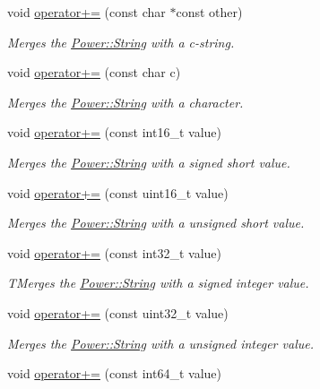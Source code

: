 \begin{DoxyCompactItemize}
void \hyperlink{class_power_1_1_string_a49e4abf34ef85a8d709aa0b6e37a283e}{operator+=} (const char $\ast$const other)
\begin{DoxyCompactList}\small\item\em Merges the \hyperlink{class_power_1_1_string}{Power\+::\+String} with a c-\/string. \end{DoxyCompactList}\item 
void \hyperlink{class_power_1_1_string_a52dac2961382313c2817ae2186d09a9e}{operator+=} (const char c)
\begin{DoxyCompactList}\small\item\em Merges the \hyperlink{class_power_1_1_string}{Power\+::\+String} with a character. \end{DoxyCompactList}\item 
void \hyperlink{class_power_1_1_string_a199f509027c45a73200cd8f6390953ca}{operator+=} (const int16\+\_\+t value)
\begin{DoxyCompactList}\small\item\em Merges the \hyperlink{class_power_1_1_string}{Power\+::\+String} with a signed short value. \end{DoxyCompactList}\item 
void \hyperlink{class_power_1_1_string_a9fc5761dcad661b80d309656efc381d4}{operator+=} (const uint16\+\_\+t value)
\begin{DoxyCompactList}\small\item\em Merges the \hyperlink{class_power_1_1_string}{Power\+::\+String} with a unsigned short value. \end{DoxyCompactList}\item 
void \hyperlink{class_power_1_1_string_a2e87aa213b473f2fd87da5563132d5b2}{operator+=} (const int32\+\_\+t value)
\begin{DoxyCompactList}\small\item\em T\+Merges the \hyperlink{class_power_1_1_string}{Power\+::\+String} with a signed integer value. \end{DoxyCompactList}\item 
void \hyperlink{class_power_1_1_string_ad2fdb962fe7425c518e9fcc533fb3f55}{operator+=} (const uint32\+\_\+t value)
\begin{DoxyCompactList}\small\item\em Merges the \hyperlink{class_power_1_1_string}{Power\+::\+String} with a unsigned integer value. \end{DoxyCompactList}\item 
void \hyperlink{class_power_1_1_string_a4de514d070a1c7bf464e97f35868e37c}{operator+=} (const int64\+\_\+t value)

\end{DoxyCompactItemize}
